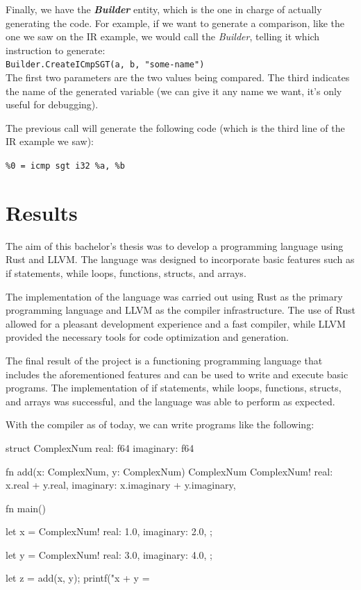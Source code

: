 ﻿\documentclass[10pt,a4paper,twocolumn,twoside]{article}
\begin{document}
Finally, we have the \textit{\textbf{Builder}} entity, which is the one in charge of 
actually generating the code. For example, if we want to generate a comparison,
like the one we saw on the IR example, we would call the \textit{Builder}, 
telling it which instruction to generate:\\

\texttt{Builder.CreateICmpSGT(a, b, "some-name")}
\\

The first two parameters are the two values being compared. The third 
indicates the name of the generated variable (we can give it any name we want,
it's only useful for debugging).

The previous call will generate the following code (which is the third line of
the IR example we saw):

\texttt{\%0 = icmp sgt i32 \%a, \%b}

\section{Results}
The aim of this bachelor's thesis was to develop a programming language using
Rust and LLVM. The language was designed to incorporate basic features such as
if statements, while loops, functions, structs, and arrays.

The implementation of the language was carried out using Rust as the primary
programming language and LLVM as the compiler infrastructure. The use of Rust
allowed for a pleasant development experience and a fast compiler, while LLVM 
provided the necessary tools for code optimization and generation.

The final result of the project is a functioning programming language that
includes the aforementioned features and can be used to write and execute basic
programs. The implementation of if statements, while loops, functions, structs,
and arrays was successful, and the language was able to perform as expected.

With the compiler as of today, we can write programs like the following:

\begin{code}
struct ComplexNum {
    real:      f64
    imaginary: f64
}

fn add(x: ComplexNum, y: ComplexNum) ComplexNum {
    ComplexNum!{
        real: x.real + y.real,
        imaginary: x.imaginary + y.imaginary,
    }
}

fn main() {
    let x = ComplexNum!{
        real: 1.0,
        imaginary: 2.0,
    };

    let y = ComplexNum!{
        real: 3.0,
        imaginary: 4.0,
    };

    let z = add(x, y);
    printf("x + y = %
}
\end{code}
\end{document}
